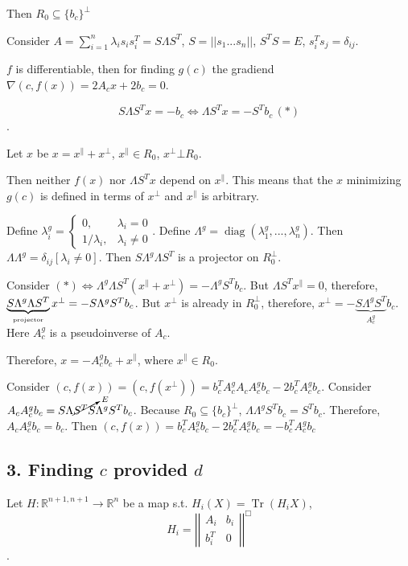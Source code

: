 \documentclass[a4paper]{article}
\DeclareMathOperator{\Tr}{Tr}
\DeclareMathOperator{\diag}{diag}
\begin{document}
Then $R_0\subseteq \{b_c\}^\bot$

Consider $A=\sum\limits_{i=1}^n \lambda_i s_is_i^T=S\Lambda S^T$, $S=||s_1 ... s_n ||$, $S^TS=E$, $s_i^Ts_j=\delta_{ij}$.

$f$ is differentiable, then for finding $g(c)$ the gradiend $\nabla (c,f(x))=2A_cx+2b_c=0$.

$$S\Lambda S^Tx=-b_c\Leftrightarrow \Lambda S^Tx=-S^Tb_c\, (*)$$.

Let $x$ be $x=x^{\parallel}+x^\bot$, $x^{\parallel}\in R_0$, $x^\bot \bot R_0$.

Then neither $f(x)$ nor $\Lambda S^T x$ depend on $x^{\parallel}$. This means that the $x$ minimizing $g(c)$ is defined in terms of $x^{\bot}$ and $x^{\parallel}$ is arbitrary.

Define $\lambda^g_i=\begin{cases}
0,&\lambda_i=0\\
1/\lambda_i,&\lambda_i\neq 0
\end{cases}$. Define $\Lambda^g=\diag(\lambda^g_1,...,\lambda^g_n)$. Then $\Lambda \Lambda^g=\delta_{ij}[\lambda_i\neq 0]$. Then $S\Lambda^g\Lambda S^T$ is a projector on $R_0^\bot$.

Consider $(*) \Leftrightarrow \Lambda^g\Lambda S^T(x^\parallel+x^\bot)=-\Lambda^gS^Tb_c$. But $\Lambda S^Tx^\parallel=0$, therefore, $\underbrace{S\Lambda^g\Lambda S^T}_{\mbox{\tiny projector}}x^\bot=-S\Lambda^gS^Tb_c$. But $x^\bot$ is already in $R_0^\bot$, therefore, $x^\bot=-\underbrace{S\Lambda^gS^T}_{A^g_c}b_c$. Here $A_c^g$ is a pseudoinverse of $A_c$.

Therefore, $\boxed{x=-A_c^gb_c+x^\parallel}$, where $x^\parallel\in R_0$.


Consider $(c,f(x))=(c,f(x^\bot))=b_c^TA_c^gA_cA_c^gb_c-2b_c^TA_c^gb_c$. Consider $A_cA_c^gb_c=S\Lambda \cancelto{E}{S^TS}\Lambda^gS^Tb_c$. Because $R_0\subseteq\{b_c\}^\bot$, $\Lambda\Lambda^gS^Tb_c=S^Tb_c$. Therefore, $A_cA_c^gb_c=b_c$. Then $(c,f(x))=b_c^TA_c^gb_c-2b_c^TA_c^gb_c=\boxed{-b_c^TA_c^gb_c}$

\subsection*{3. Finding $c$ provided $d$}
Let $H\colon \mathbb{R}^{n+1, n+1}\to \mathbb{R}^n$ be a map s.t. $H_i(X)=\Tr(H_iX)$, $$H_i=\left|\left|
\begin{array}{cc}
A_i & b_i\\
b_i^T & 0
\end{array}
\right|\right|^{\Box}$$.
\end{document}
